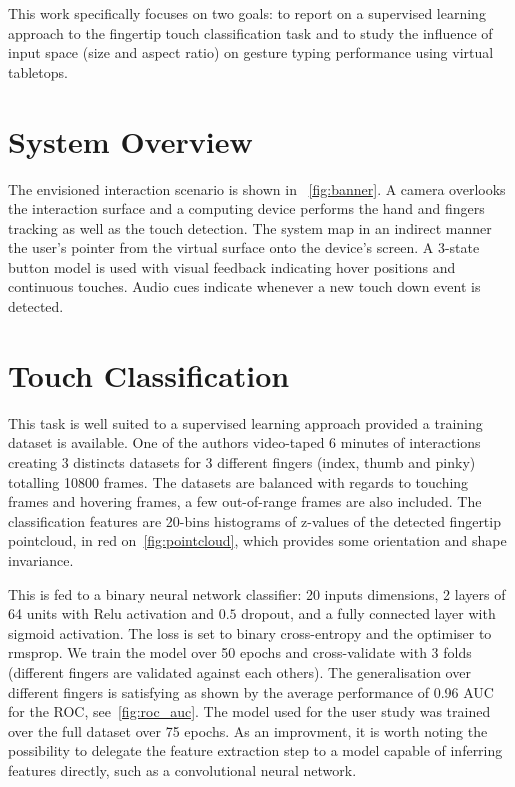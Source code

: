\documentclass{chi-ext}
\begin{document}
This work specifically focuses on two goals: to report on a supervised learning approach to the fingertip touch classification task and to study the influence of input space (size and aspect ratio) on gesture typing performance using virtual tabletops.

\section{System Overview}
The envisioned interaction scenario is shown in ~\autoref{fig:banner}. A camera overlooks the interaction surface and a computing device performs the hand and fingers tracking as well as the touch detection. The system map in an indirect manner the user's pointer from the virtual surface onto the device's screen. A 3-state button model is used with visual feedback indicating hover positions and continuous touches. Audio cues indicate whenever a new touch down event is detected.

\section{Touch Classification}
This task is well suited to a supervised learning approach provided a training dataset is available. One of the authors video-taped 6 minutes of interactions creating 3 distincts datasets for 3 different fingers (index, thumb and pinky) totalling 10800 frames. The datasets are balanced with regards to touching frames and hovering frames, a few out-of-range frames are also included. The classification features are 20-bins histograms of z-values of the detected fingertip pointcloud, in red on~\autoref{fig:pointcloud}, which provides some orientation and shape invariance.

This is fed to a binary neural network classifier: 20 inputs dimensions, 2 layers of 64 units with Relu activation and $0.5$ dropout, and a fully connected layer with sigmoid activation. The loss is set to binary cross-entropy and the optimiser to rmsprop. We train the model over 50 epochs and cross-validate with 3 folds (different fingers are validated against each others). The generalisation over different fingers is satisfying as shown by the average performance of 0.96 AUC for the ROC,
see~\autoref{fig:roc_auc}. The model used for the user study was trained over the full dataset over 75 epochs. As an improvment, it is worth noting the possibility to delegate the feature extraction step to a model capable of inferring features directly, such as a convolutional neural network.
\end{document}
